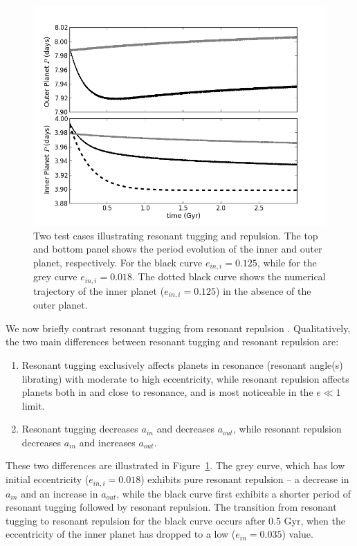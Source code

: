 \begin{figure}
\centerline{\includegraphics[trim=0cm 0cm 1cm 1cm, scale=0.48]{chap3/tugg_v_repulse_July20.png}}
\caption{ Two test cases illustrating resonant tugging and repulsion.
The top and bottom panel shows the period evolution of the inner and outer planet, respectively.
For the black curve $e_{in,i} = 0.125$, while for the grey curve $e_{in,i} = 0.018$. 
The dotted black curve shows the numerical trajectory of the inner planet ($e_{in,i} = 0.125$) in the absence of the outer planet.
}
\label{fig:repulse}
\end{figure}

We now briefly contrast resonant tugging from resonant repulsion \citep[first described by][]{LithwickWu2012}.
Qualitatively, the two main differences between resonant tugging and resonant repulsion are:
\begin{enumerate}
\item Resonant tugging exclusively affects planets in resonance (resonant angle(s) librating) with moderate to high eccentricity, while resonant repulsion affects planets both in and close to resonance, and is most noticeable in the $e \ll 1$ limit. 

\item Resonant tugging decreases $a_{in}$ and decreases $a_{out}$, while resonant repulsion decreases $a_{in}$ and increases $a_{out}$. 
\end{enumerate}

These two differences are illustrated in Figure~\ref{fig:repulse}.
The grey curve, which has low initial eccentricity ($e_{in,i} = 0.018$) exhibits pure resonant repulsion -- a decrease in $a_{in}$ and an increase in $a_{out}$, while the black curve first exhibits a shorter period of resonant tugging followed by resonant repulsion.
The transition from resonant tugging to resonant repulsion for the black curve occurs after 0.5 Gyr, when the eccentricity of the inner planet has dropped to a low ($e_{in} = 0.035$) value.

